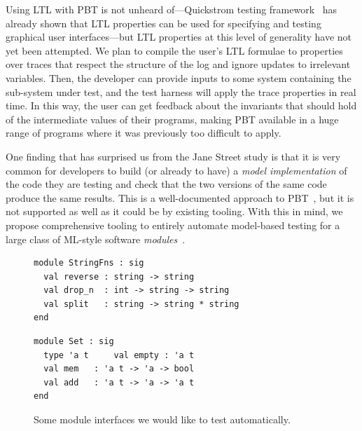 Using LTL with PBT is not unheard of---Quickstrom testing
framework~\cite{oconnor_quickstrom_2022} has already shown that LTL properties
can be used for specifying and testing graphical user interfaces---but LTL
properties at this level of generality have not yet been attempted. We plan to
compile the user's LTL formulae to properties over traces that respect the
structure of the log and ignore updates to irrelevant variables. Then, the
developer can provide inputs to some system containing the sub-system under
test, and the test harness will apply the trace properties in real time. In this
way, the user can get feedback about the invariants that should hold of the
intermediate values of their programs, making PBT available in a huge range of
programs where it was previously too difficult to apply.

One finding that has surprised us from the Jane Street study is that
it is {very} common for developers to build (or already to have) a
{\em model
implementation} of the code they are testing and check that the two versions of
the same code produce the same results.  This is a well-documented approach to
PBT~\cite{hughes_experiences_2016}, but it is not supported as well as it could
be by existing tooling.
%
With this in mind, we propose comprehensive tooling to entirely automate
model-based testing for a large class of ML-style software
{\em modules}~\cite{macqueen_modules_1984}.

\begin{figure}[t]
  \begin{minipage}{.45\textwidth}
\begin{lstlisting}
module StringFns : sig
  val reverse : string -> string
  val drop_n  : int -> string -> string
  val split   : string -> string * string
end
\end{lstlisting}
  \end{minipage}
  \qquad\qquad
  \begin{minipage}{.45\textwidth}
\begin{lstlisting}
module Set : sig
  type 'a t     val empty : 'a t
  val mem   : 'a t -> 'a -> bool
  val add   : 'a t -> 'a -> 'a t
end
\end{lstlisting}
  \end{minipage}
  \caption{Some module interfaces we would like to test
    automatically.}\label{fig:sigs}
\end{figure}

